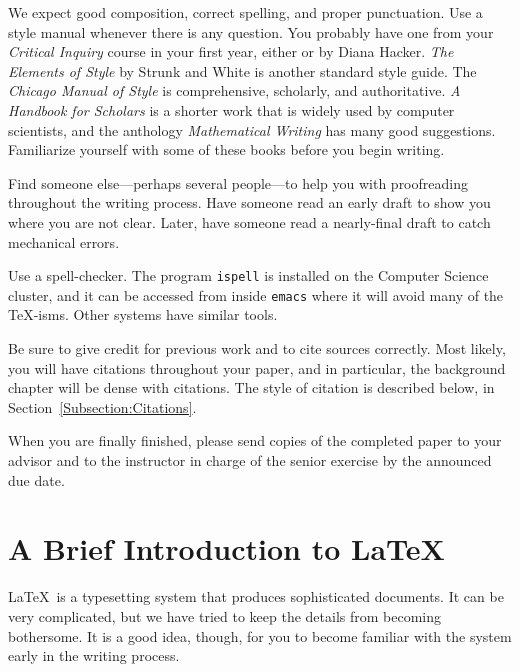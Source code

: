 \documentclass[finalcopy]{srpaper}
\def\hyperref[#1]{}
\let\plainref\ref
\newcommand{\plainref}{\ref*}
\newcommand{\namedref}[2]{\hyperref[#2]{#1~\plainref{#2}}}
\begin{document}
We expect good composition, correct spelling, and proper
punctuation. Use a style manual whenever there is any
question. You probably have one from your \emph{Critical
Inquiry} course in your first year, either
\cite{DHackerReference} or \cite{DHackerRules} by Diana
Hacker. \textit{The Elements of Style} \cite{StrunkWhite} by
Strunk and White is another standard style guide. The
\textit{Chicago Manual of Style} \cite{ChicagoStyle} is
comprehensive, scholarly, and authoritative. \textit{A
Handbook for Scholars} \cite{HandbookForScholars} is a
shorter work that is widely used by computer scientists, and
the anthology \textit{Mathematical Writing}
\cite{KnuthMathWriting} has many good
suggestions. Familiarize yourself with some of these books
before you begin writing.

Find someone else---perhaps several people---to help you
with proofreading throughout the writing process. Have
someone read an early draft to show you where you are not
clear. Later, have someone read a nearly-final draft to
catch mechanical errors.

Use a spell-checker.
The program \texttt{ispell} is
installed on the Computer Science cluster, and it can be
accessed from inside \texttt{emacs} where it will avoid many
of the \TeX-isms. Other systems have similar tools.

Be sure to give credit for previous work and to cite sources
correctly.  Most likely, you will have citations throughout
your paper, and in particular, the background chapter will
be dense with citations. The style of citation is described
below, in \namedref{Section}{Subsection:Citations}.

When you are finally finished, please send copies of the
completed paper to your advisor and to the instructor in
charge of the senior exercise by the announced due date.%
%


\section{A Brief Introduction to \LaTeX}
\label{Section:LaTeXIntro}
\LaTeX\ is a typesetting system that produces sophisticated
documents. It can be very complicated, but we have tried to
keep the details from becoming bothersome. It is a good
idea, though, for you to become familiar with the system
early in the writing process.
\end{document}
